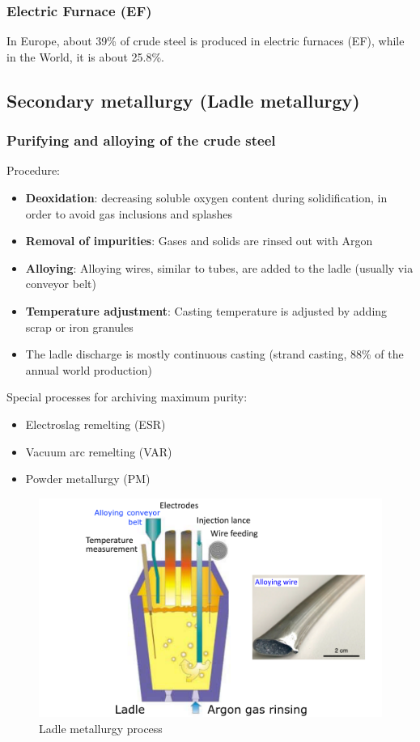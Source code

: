 \documentclass{article}
\begin{document}
\subsubsection{Electric Furnace (EF)}
In Europe, about 39\% of crude steel is produced in electric furnaces (EF),
while in the World, it is about 25.8\%.

\subsection{Secondary metallurgy (Ladle metallurgy)}
\subsubsection{Purifying and alloying of the crude steel}
Procedure:
\begin{itemize}
  \item \textbf{Deoxidation}: decreasing soluble oxygen content during solidification, in order to avoid gas inclusions and splashes
  \item \textbf{Removal of impurities}: Gases and solids are rinsed out with Argon
  \item \textbf{Alloying}: Alloying wires, similar to tubes, are added to the ladle (usually via conveyor belt)
  \item \textbf{Temperature adjustment}: Casting temperature is adjusted by adding scrap or iron granules
  \item The ladle discharge is mostly continuous casting (strand casting, 88\% of the annual world production)
\end{itemize}

Special processes for archiving maximum purity:
\begin{itemize}
  \item Electroslag remelting (ESR)
  \item Vacuum arc remelting (VAR)
  \item Powder metallurgy (PM)
\end{itemize}

\begin{figure}[ht!]
  \centering
  \includegraphics[width=.61\textwidth]{media/ladle_metallurgy.png}
  \caption*{Ladle metallurgy process}
\end{figure}
\end{document}
